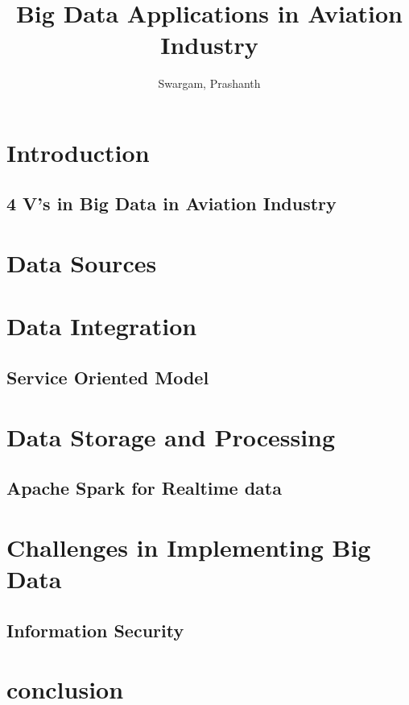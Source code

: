 \documentclass[sigconf]{acmart}
\begin{document}
\title{Big Data Applications in Aviation Industry}


\author{Swargam, Prashanth}


\renewcommand{\shortauthors}{B. Trovato et al.}


\begin{abstract}

\end{abstract}


\maketitle

\section{Introduction}



\subsection{4 V's in Big Data in Aviation Industry}



\section{Data Sources}


\section{Data Integration}

\subsection{Service Oriented Model}

 

\section{Data Storage and Processing}
 

\subsection{Apache Spark for Realtime data}


\section{Challenges in Implementing Big Data}
\subsection{Information Security}

\section{conclusion}




 
\end{document}
